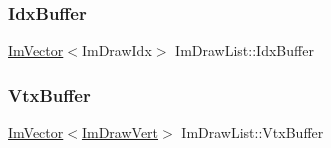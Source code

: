 \hypertarget{struct_im_draw_list_adf292ff70a954d82daf061c609e75dfc}{}\label{struct_im_draw_list_adf292ff70a954d82daf061c609e75dfc} 
\subsubsection{\texorpdfstring{Idx\+Buffer}{IdxBuffer}}
{\footnotesize\ttfamily \hyperlink{class_im_vector}{Im\+Vector}$<$Im\+Draw\+Idx$>$ Im\+Draw\+List\+::\+Idx\+Buffer}

\hypertarget{struct_im_draw_list_aa8ff4aee39cf3c3791b7e29a7b4264be}{}\label{struct_im_draw_list_aa8ff4aee39cf3c3791b7e29a7b4264be} 
\subsubsection{\texorpdfstring{Vtx\+Buffer}{VtxBuffer}}
{\footnotesize\ttfamily \hyperlink{class_im_vector}{Im\+Vector}$<$\hyperlink{struct_im_draw_vert}{Im\+Draw\+Vert}$>$ Im\+Draw\+List\+::\+Vtx\+Buffer}

